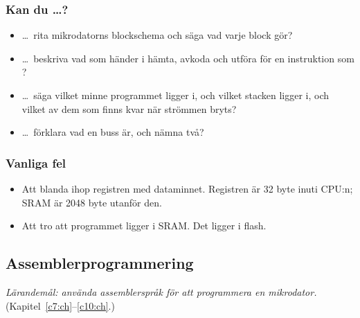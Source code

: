 \subsubsection{Kan du \dots?}
\begin{itemize}
  \item \dots\ rita mikrodatorns blockschema och säga vad varje block gör?
  \item \dots\ beskriva vad som händer i hämta, avkoda och utföra för en instruktion som
    ?
  \item \dots\ säga vilket minne programmet ligger i, och vilket stacken ligger i, och vilket av dem
    som finns kvar när strömmen bryts?
  \item \dots\ förklara vad en buss är, och nämna två?
\end{itemize}

\subsubsection{Vanliga fel}
\begin{itemize}
  \item Att blanda ihop registren med dataminnet. Registren är 32 byte inuti CPU:n; SRAM är
    2048 byte utanför den.
  \item Att tro att programmet ligger i SRAM. Det ligger i flash.
\end{itemize}

\subsection{Assemblerprogrammering}
\label{c12:a6}
\emph{Lärandemål: använda assemblerspråk för att programmera en mikrodator.}
(Kapitel~\ref{c7:ch}--\ref{c10:ch}.)

